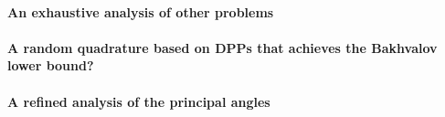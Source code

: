 \documentclass[twoside,11pt]{book}
\numberwithin{theorem}{chapter}
\numberwithin{definition}{chapter}
\numberwithin{proposition}{chapter}
\numberwithin{corollary}{chapter}
\numberwithin{example}{chapter}
\numberwithin{lemma}{chapter}
\numberwithin{assumption}{chapter}
\begin{document}
\paragraph{An exhaustive analysis of other problems}
\paragraph{A random quadrature based on DPPs that achieves the Bakhvalov lower bound?}
\paragraph{A refined analysis of the principal angles}

\listoffigures

\listoftables





\end{document}
